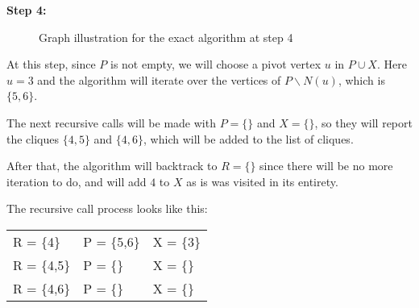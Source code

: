 \begin{minipage}{\linewidth}
    \textbf{Step 4:} \newline
    \begin{minipage}{0.4\textwidth}
        \begin{figure}[H]
            \centering
            \caption{Graph illustration for the exact algorithm at step 4}
            \label{fig:exact-mewc-step4}
        \end{figure}
    \end{minipage}
    \begin{minipage}{0.6\textwidth}
        At this step, since $P$ is not empty, we will choose a pivot vertex $u$
        in $P\cup X$. Here $u = 3$ and the algorithm will iterate over the
        vertices of $P\backslash N(u)$, which is $\{5,6\}$. \newline

        The next recursive calls will be made with $P = \{\}$ and $X = \{\}$, so
        they will report the cliques $\{4,5\}$ and $\{4,6\}$, which will be
        added to the list of cliques. \newline

        After that, the algorithm will backtrack to $R=\{\}$ since there will be
        no more iteration to do, and will add $4$ to $X$ as is was visited in
        its entirety. \newline

        The recursive call process looks like this:
        \begin{center}
            \begin{tabular}{|lll|}
                \hline
                R = \{4\}   & P = \{5,6\} & X = \{3\} \\
                R = \{4,5\} & P = \{\}    & X = \{\}  \\
                R = \{4,6\} & P = \{\}    & X = \{\}  \\
                \hline
            \end{tabular}
        \end{center}
    \end{minipage}
\end{minipage} \newline

